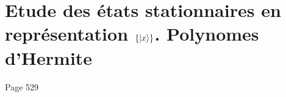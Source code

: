 \chapter{Etude des états stationnaires en représentation $\left\{ \ket{x} \right\}$. Polynomes d'Hermite}
\label{chapter:polynome_hermite}
Page 529
